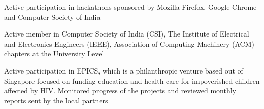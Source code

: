 \vspace{-5mm}
\begin{cventries}
  \cventry
    {}{}{}{}
    {
      \begin{cvitems}
        \item {Active participation in hackathons sponsored by Mozilla Firefox, Google Chrome and Computer Society of India}
        \item {Active member in Computer Society of India (CSI), The Institute of Electrical and Electronics Engineers (IEEE), Association of Computing Machinery (ACM) chapters at the University Level}
        \item{Active participation in EPICS, which is a philanthropic venture based out of Singapore focused on funding education and health-care for impoverished children affected by HIV. Monitored progress of the projects and reviewed monthly reports sent by the local partners}
        \vspace{-3mm}
      \end{cvitems}
    }
\end{cventries}
